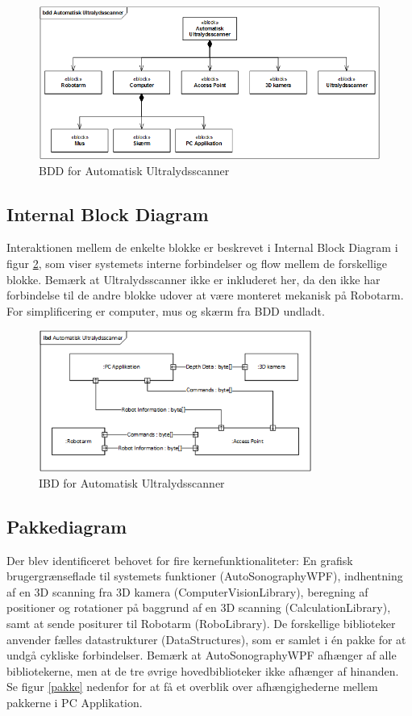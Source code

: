 \begin{figure}[H]
    \centering
    \includegraphics[width=1\textwidth]{figurer/d/Design/BDD}
    \caption{BDD for Automatisk Ultralydsscanner}
    \label{BDD}
\end{figure}

\subsection{Internal Block Diagram}
Interaktionen mellem de enkelte blokke er beskrevet i Internal Block Diagram i figur \ref{IBD}, som viser systemets interne forbindelser og flow mellem de forskellige blokke. Bemærk at Ultralydsscanner ikke er inkluderet her, da den ikke har forbindelse til de andre blokke udover at være monteret mekanisk på Robotarm. For simplificering er computer, mus og skærm fra BDD undladt.

\begin{figure}[H]
    \centering
    \includegraphics[width=0.8\textwidth]{figurer/d/Design/IBD}
    \caption{IBD for Automatisk Ultralydsscanner}
    \label{IBD}
\end{figure}

\subsection{Pakkediagram}
Der blev identificeret behovet for fire kernefunktionaliteter: En grafisk brugergrænseflade til systemets funktioner (AutoSonographyWPF), indhentning af en 3D scanning fra 3D kamera (ComputerVisionLibrary), beregning af positioner og rotationer på baggrund af en 3D scanning (CalculationLibrary), samt at sende positurer til Robotarm (RoboLibrary). De forskellige biblioteker anvender fælles datastrukturer (DataStructures), som er samlet i én pakke for at undgå cykliske forbindelser. Bemærk at AutoSonographyWPF afhænger af alle bibliotekerne, men at de tre øvrige hovedbiblioteker ikke afhænger af hinanden. Se figur \ref{pakke} nedenfor for at få et overblik over afhængighederne mellem pakkerne i PC Applikation. 

